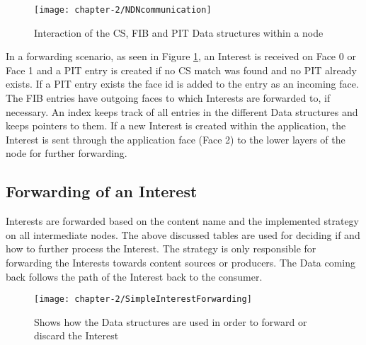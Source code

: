 \vspace{5mm} %

\begin{figure}[H]
  \centering
  \texttt{[image: chapter-2/NDNcommunication]}
  \caption{Interaction of the CS, FIB and PIT Data structures within a node \cite{ndn17}}
  \label{fig:NDNcommunication}
\end{figure}

In a forwarding scenario, as seen in Figure \ref{fig:NDNcommunication}, an Interest is received on Face 0 or Face 1 and a PIT entry is created if no CS match was found and no PIT already exists. If a PIT entry exists the face id is added to the entry as an incoming face. The FIB entries have outgoing faces to which Interests are forwarded to, if necessary. An index keeps track of all entries in the different Data structures and keeps pointers to them. If a new Interest is created within the application, the Interest is sent through the application face (Face 2) to the lower layers of the node for further forwarding. 

\subsection{Forwarding of an Interest}

Interests are forwarded based on the content name and the implemented strategy on all intermediate nodes. The above discussed tables are used for deciding if and how to further process the Interest. The strategy is only responsible for forwarding the Interests towards content sources or producers. The Data coming back follows the path of the Interest back to the consumer.

\vspace{5mm} %

\begin{figure}[H]
  \centering
  \texttt{[image: chapter-2/SimpleInterestForwarding]}
  \caption{Shows how the Data structures are used in order to forward or discard the Interest \cite{amadeo14}}
  \label{fig:SimpleInterestForwarding}
\end{figure}

\vspace{5mm} %

